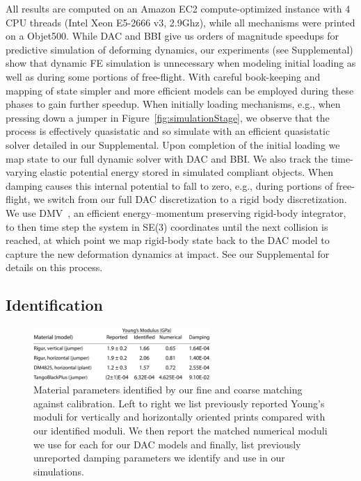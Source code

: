 All results are computed on an Amazon EC2 compute-optimized instance with 4 CPU threads (Intel Xeon E5-2666 v3, 2.9Ghz), while all mechanisms were printed on a Objet500.
While DAC and BBI give us orders of magnitude speedups for predictive simulation of deforming dynamics, our experiments (see Supplemental) show that dynamic FE simulation is unnecessary when modeling initial loading as well as during some portions of free-flight. With careful book-keeping and mapping of state simpler and more efficient models can be employed during these phases to gain further speedup.
When initially loading mechanisms, e.g., when pressing down a jumper in Figure~\ref{fig:simulationStage}, we observe that the process is effectively quasistatic and so simulate with an efficient quasistatic solver detailed in our Supplemental. Upon completion of the initial loading we map state to our full dynamic solver with DAC and BBI.
We also track the time-varying elastic potential energy stored in simulated compliant objects. When damping causes this internal potential to fall to zero, e.g., during portions of free-flight, we switch from our full DAC discretization to a rigid body discretization. We use DMV~\citep{Moser:1991dl}, an efficient energy--momentum preserving rigid-body integrator, to then time step the system in SE(3) coordinates until the next collision is reached, at which point we map rigid-body state back to the DAC model to capture the new deformation dynamics at impact. See our Supplemental for details on this process.

\subsection{Identification}
\begin{figure}[h!]
\centering
\includegraphics[width=0.6\textwidth]{figs/materials_table}
\caption{Material parameters identified by our fine and coarse matching against calibration. Left to right we list previously reported Young's moduli for vertically and horizontally oriented prints compared with our identified moduli. We then report the matched numerical moduli we use for each for our DAC models and finally, list previously unreported damping parameters we identify and use in our simulations. 
}
\label{fig:identified_params}
\end{figure}

